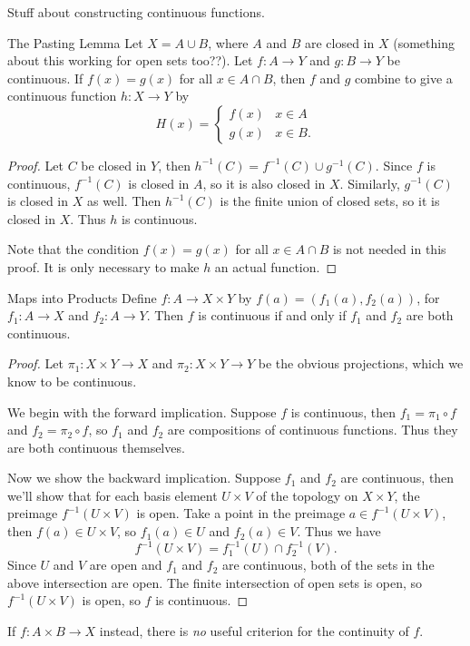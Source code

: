 \documentclass[10pt]{report}
\begin{document}
{\color{red}Stuff about constructing continuous functions.}

\begin{thrm}{The Pasting Lemma}{}
	Let $X = A \cup B$, where $A$ and $B$ are closed in $X$ {\color{red}(something about this working for open sets too??)}. Let $f:A \to Y$ and $g:B\to Y$ be continuous. If $f(x)=g(x)$ for all $x \in A \cap B$, then $f$ and $g$ combine to give a continuous function $h : X \to Y$ by
	\[
		H(x)=
		\begin{cases}
			f(x) & x \in A \\
			g(x) & x\in B.
		\end{cases}
	\] 
\end{thrm}
\begin{proof}
	Let $C$ be closed in $Y$, then $h^{-1}(C) = f^{-1}(C) \cup g^{-1}(C)$. Since $f$ is continuous, $f^{-1}(C)$ is closed in $A$, so it is also closed in $X$. Similarly, $g^{-1}(C)$ is closed in $X$ as well. Then $h^{-1}(C)$ is the finite union of closed sets, so it is closed in $X$. Thus $h$ is continuous.

	Note that the condition $f(x) = g(x)$ for all $x \in A \cap B$ is not needed in this proof. It is only necessary to make $h$ an actual function.
\end{proof}

\begin{thrm}{Maps into Products}{}
	Define $f:A\to X \times Y$ by $f(a)=(f_1(a), f_2(a))$, for $f_1:A\to X$ and $f_2:A\to Y$. Then $f$ is continuous if and only if $f_1$ and $f_2$ are both continuous.
\end{thrm}
\begin{proof}
	Let $\pi_1:X\times Y\to X$ and $\pi_2:X\times Y\to Y$ be the obvious projections, which we know to be continuous.

	We begin with the forward implication. Suppose $f$ is continuous, then $f_1=\pi_1 \circ f$ and $f_2=\pi_2 \circ f$, so $f_1$ and $f_2$ are compositions of continuous functions. Thus they are both continuous themselves.

	Now we show the backward implication. Suppose $f_1$ and $f_2$ are continuous, then we'll show that for each basis element $U \times V$ of the topology on $X \times Y$, the preimage $f^{-1}(U \times V)$ is open. Take a point in the preimage $a \in f^{-1}(U \times V)$, then $f(a) \in U \times V$, so $f_1(a) \in U$ and $f_2(a) \in V$. Thus we have
	\[
		f^{-1}(U \times V) = f_1^{-1}(U) \cap f_2^{-1}(V).
	\] Since $U$ and $V$ are open and $f_1$ and $f_2$ are continuous, both of the sets in the above intersection are open. The finite intersection of open sets is open, so $f^{-1}(U\times V)$ is open, so $f$ is continuous.
\end{proof}

\begin{note}{}{}
	If $f:A\times B\to X$ instead, there is \textit{no} useful criterion for the continuity of $f$.
\end{note}
\end{document}
